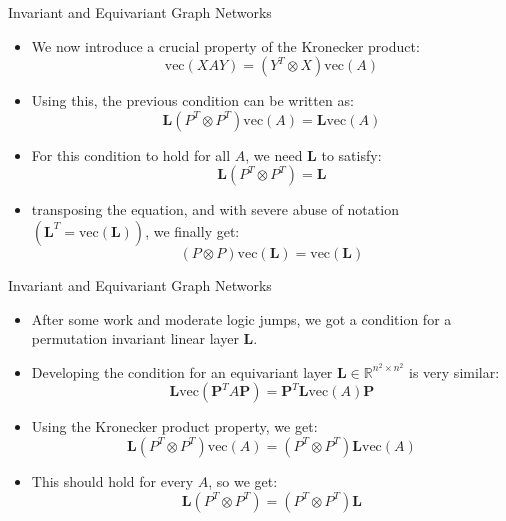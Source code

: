 \documentclass{beamer}
\begin{document}
\begin{frame}{Invariant and Equivariant Graph Networks}
    \begin{itemize}
        \setlength{\itemsep}{\fill}
        \item We now introduce a crucial property of the Kronecker product:
        \[ \text{vec}(XAY)= (Y^T\otimes X)\text{vec}(A)\]
        \pause
        \item Using this, the previous condition can be written as:
        \[ \mathbf{L}(P^T\otimes P^T)\text{vec}(A) = \mathbf{L}\text{vec}(A) \]
        \pause
        \item For this condition to hold for all $A$, we need $\mathbf{L}$ to satisfy:
        \[ \mathbf{L}(P^T\otimes P^T) = \mathbf{L} \]
        \pause
        \item transposing the equation, and with severe abuse of notation $(\mathbf{L}^T = \text{vec}(\mathbf{L}))$, we finally get:
        \[ (P\otimes P)\text{vec}(\mathbf{L}) = \text{vec}(\mathbf{L}) \]
    \end{itemize}
\end{frame}
\begin{frame}{Invariant and Equivariant Graph Networks}
    \begin{itemize}
        \setlength{\itemsep}{\fill}
        \item After some work and moderate logic jumps, we got a condition for a permutation invariant linear layer $\mathbf{L}$.
        \pause
        \item Developing the condition for an equivariant layer $\mathbf{L} \in \mathbb{R}^{n^2 \times n^2}$ is very similar:
        \pause
        \[ \mathbf{L}\text{vec}(\boldsymbol{P}^T A\boldsymbol{P}) =\boldsymbol{P}^T \mathbf{L}\text{vec}(A) \boldsymbol{P}\]
        \pause
        \item Using the Kronecker product property, we get:
        \[ \mathbf{L}(P^T\otimes P^T)\text{vec}(A) = (P^T\otimes P^T)\mathbf{L}\text{vec}(A) \]
        \pause
        \item This should hold for every $A$, so we get:
        \[ \mathbf{L}(P^T\otimes P^T) = (P^T\otimes P^T)\mathbf{L} \]
    \end{itemize}
\end{frame}
\end{document}
